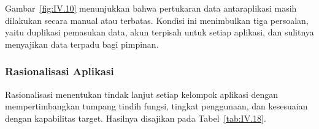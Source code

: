 Gambar~\ref{fig:IV.10} menunjukkan bahwa pertukaran data antaraplikasi masih dilakukan secara manual atau terbatas. Kondisi ini menimbulkan tiga persoalan, yaitu duplikasi pemasukan data, akun terpisah untuk setiap aplikasi, dan sulitnya menyajikan data terpadu bagi pimpinan.

\subsubsection{Rasionalisasi Aplikasi}
\label{sec:IV.4.2.3}

Rasionalisasi menentukan tindak lanjut setiap kelompok aplikasi dengan mempertimbangkan tumpang tindih fungsi, tingkat penggunaan, dan kesesuaian dengan kapabilitas target. Hasilnya disajikan pada Tabel~\ref{tab:IV.18}.

\begingroup\small{}
